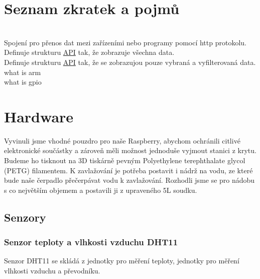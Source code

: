 \documentclass[12pt,a4paper]{article}
\begin{document}
\section{Seznam zkratek a pojmů}
\begin{acronym}
	 \\
		Spojení pro přenos dat mezi zařízeními nebo programy pomocí http protokolu.
	 \\
		Definuje strukturu \underline{\ac{API}} tak, že zobrazuje všechna data.
	 \\
		Definuje strukturu \underline{\ac{API}} tak, že se zobrazujou pouze vybraná a vyfilterovaná data. 
	 \\ 
		what is arm
	 \\ 
		what is gpio
\end{acronym}

\clearpage

\section{Hardware}

Vyvinuli jsme vhodné pouzdro pro naše Raspberry, abychom ochránili citlivé elektronické součástky a zároveň měli možnost jednoduše vyjmout stanici z krytu. Budeme ho tisknout na 3D tiskárně pevným Polyethylene terephthalate glycol (PETG) filamentem. K zavlažování je potřeba postavit i nádrž na vodu, ze které bude naše čerpadlo přečerpávat vodu k zavlažování. Rozhodli jsme se pro nádobu s co největším objemem a postavili ji z upraveného 5L soudku.

\subsection{Senzory}

\subsubsection{Senzor teploty a vlhkosti vzduchu DHT11}

Senzor \ac{DHT11} se skládá z jednotky pro měření teploty, jednotky pro měření vlhkosti vzduchu a převodníku.
\end{document}
